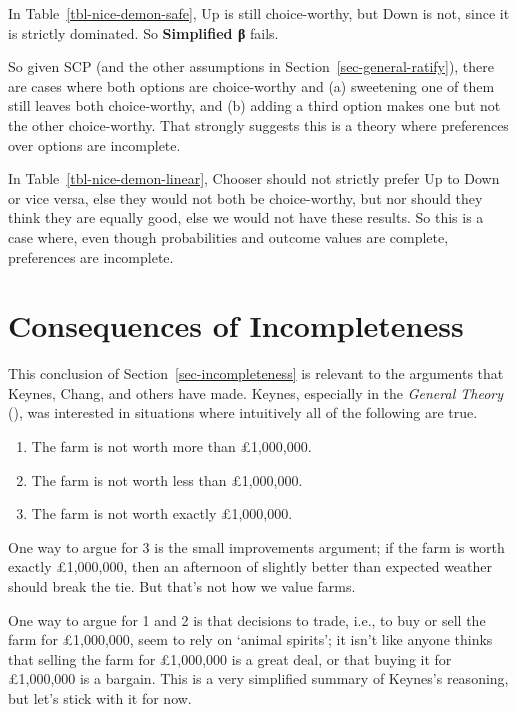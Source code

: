 \documentclass[
  10pt,
  letterpaper,
  DIV=11,
  numbers=noendperiod,
  twoside]{scrartcl}
\providecommand{\tightlist}{%
  \setlength{\itemsep}{0pt}\setlength{\parskip}{0pt}}\usepackage{longtable,booktabs,array}
\begin{document}
In Table~\ref{tbl-nice-demon-safe}, Up is still choice-worthy, but Down
is not, since it is strictly dominated. So \textbf{Simplified β} fails.

So given SCP (and the other assumptions in
Section~\ref{sec-general-ratify}), there are cases where both options
are choice-worthy and (a) sweetening one of them still leaves both
choice-worthy, and (b) adding a third option makes one but not the other
choice-worthy. That strongly suggests this is a theory where preferences
over options are incomplete.

In Table~\ref{tbl-nice-demon-linear}, Chooser should not strictly prefer
Up to Down or vice versa, else they would not both be choice-worthy, but
nor should they think they are equally good, else we would not have
these results. So this is a case where, even though probabilities and
outcome values are complete, preferences are incomplete.

\section{Consequences of
Incompleteness}\label{consequences-of-incompleteness}

This conclusion of Section~\ref{sec-incompleteness} is relevant to the
arguments that Keynes, Chang, and others have made. Keynes, especially
in the \emph{General Theory} (),
was interested in situations where intuitively all of the following are
true.

\begin{enumerate}
\def\labelenumi{\arabic{enumi}.}
\tightlist
\item
  The farm is not worth more than £1,000,000.
\item
  The farm is not worth less than £1,000,000.
\item
  The farm is not worth exactly £1,000,000.
\end{enumerate}

One way to argue for 3 is the small improvements argument; if the farm
is worth exactly £1,000,000, then an afternoon of slightly better than
expected weather should break the tie. But that's not how we value
farms.

One way to argue for 1 and 2 is that decisions to trade, i.e., to buy or
sell the farm for £1,000,000, seem to rely on `animal spirits'; it isn't
like anyone thinks that selling the farm for £1,000,000 is a great deal,
or that buying it for £1,000,000 is a bargain. This is a very simplified
summary of Keynes's reasoning, but let's stick with it for now.
\end{document}
